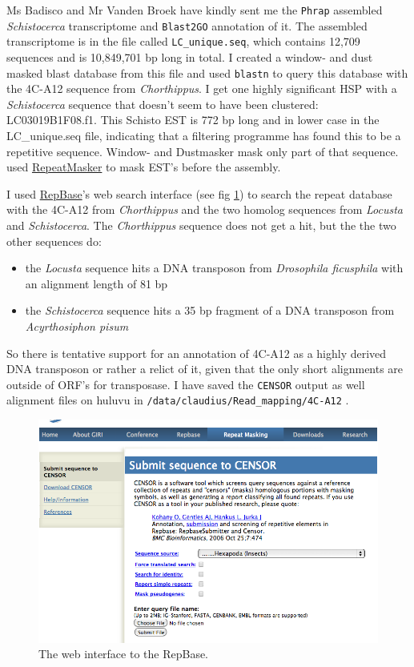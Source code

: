 \documentclass{article}\usepackage[]{graphicx}\usepackage[]{color}
\begin{document}
Ms Badisco and Mr Vanden Broek have kindly sent me the \texttt{Phrap} assembled \textit{Schistocerca} transcriptome and \texttt{Blast2GO} annotation of it. The assembled transcriptome is in the file called \texttt{LC\_unique.seq}, which contains 12,709 sequences and is 10,849,701 bp long in total. I created a window- and dust masked blast database from this file and used \texttt{blastn} to query this database with the 4C-A12 sequence from \textit{Chorthippus}. I get one highly significant HSP with a \textit{Schistocerca} sequence that doesn't seem to have been clustered: LC03019B1F08.f1. This Schisto EST is 772 bp long and in lower case in the LC\_unique.seq file, indicating that a filtering programme has found this to be a repetitive sequence. Window- and Dustmasker mask only part of that sequence. \cite{Badisco2011} used \href{http://www.repeatmasker.org/}{RepeatMasker} to mask EST's before the assembly.

I used \href{http://www.girinst.org/censor/index.php}{\textsf{RepBase}}'s web search interface (see fig \ref{censor}) to search the repeat database with the 4C-A12 from \textit{Chorthippus} and the two homolog sequences from \textit{Locusta} and \textit{Schistocerca}. The \textit{Chorthippus} sequence does not get a hit, but the the two other sequences do:
\begin{itemize}
\item the \textit{Locusta} sequence hits a DNA transposon from \textit{Drosophila ficusphila} with an alignment length of 81 bp
\item the \textit{Schistocerca} sequence hits a 35 bp fragment of a DNA transposon from \textit{Acyrthosiphon pisum}
\end{itemize}
So there is tentative support for an annotation of 4C-A12 as a highly derived DNA transposon or rather a relict of it, given that the only short alignments are outside of ORF's for transposase. I have saved the \texttt{CENSOR} output as well alignment files on huluvu in \texttt{/data/claudius/Read\_mapping/4C-A12} .

\begin{figure}
\includegraphics[width=.9\textwidth]{./figure/CENSOR}
\caption{The web interface to the RepBase.}
\label{censor}
\end{figure}
\end{document}
